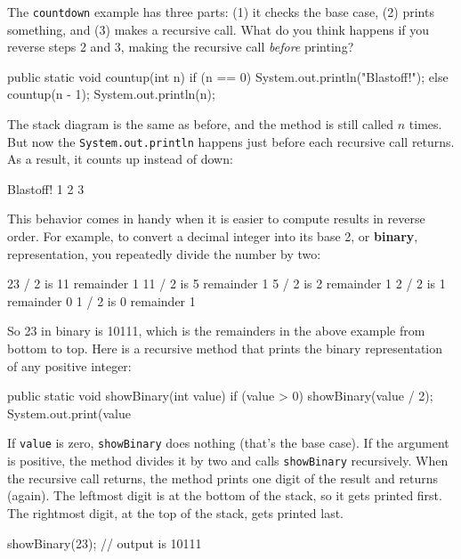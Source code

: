 \documentclass[12pt]{book}
\theoremstyle{exercise}
\newcommand{\java}[1]{\verb"#1"}
\newcommand{\java}[1]{\lstinline{#1}} %
\begin{document}
The \java{countdown} example has three parts: (1) it checks the base case, (2) prints something, and (3) makes a recursive call.
What do you think happens if you reverse steps 2 and 3, making the recursive call {\it before} printing?

\begin{code}
    public static void countup(int n) {
        if (n == 0) {
            System.out.println("Blastoff!");
        } else {
            countup(n - 1);
            System.out.println(n);
        }
    }
\end{code}

The stack diagram is the same as before, and the method is still called $n$ times.
But now the \java{System.out.println} happens just before each recursive call returns.
As a result, it counts up instead of down:

\begin{stdout}
Blastoff!
1
2
3
\end{stdout}

This behavior comes in handy when it is easier to compute results in reverse order.
For example, to convert a decimal integer into its base 2, or {\bf binary}, representation, you repeatedly divide the number by two:

\begin{stdout}
23 / 2 is 11 remainder 1
11 / 2 is  5 remainder 1
 5 / 2 is  2 remainder 1
 2 / 2 is  1 remainder 0
 1 / 2 is  0 remainder 1
\end{stdout}

So 23 in binary is 10111, which is the remainders in the above example from bottom to top.
Here is a recursive method that prints the binary representation of any positive integer:

\begin{code}
    public static void showBinary(int value) {
        if (value > 0) {
            showBinary(value / 2);
            System.out.print(value %
        }
    }
\end{code}

If \java{value} is zero, \java{showBinary} does nothing (that's the base case).
If the argument is positive, the method divides it by two and calls \java{showBinary} recursively.
When the recursive call returns, the method prints one digit of the result and returns (again).
The leftmost digit is at the bottom of the stack, so it gets printed first.
The rightmost digit, at the top of the stack, gets printed last.

\begin{code}
    showBinary(23);
    // output is 10111
\end{code}
\end{document}

